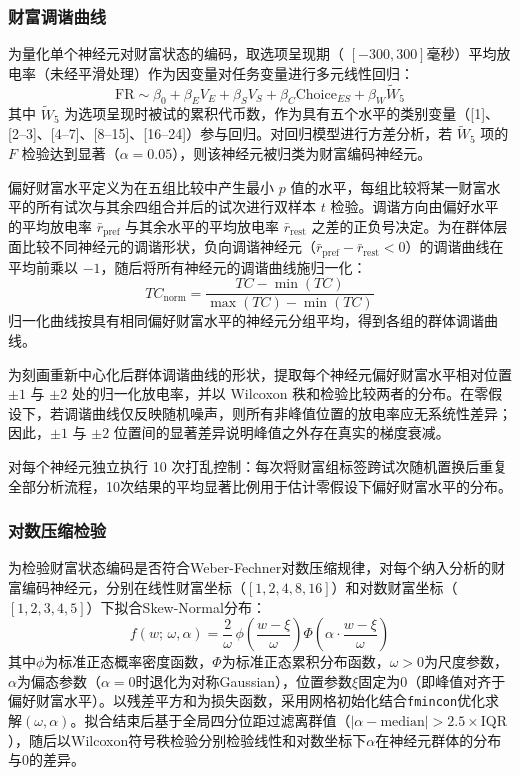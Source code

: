 \subsubsection{财富调谐曲线}\label{chap2:methods_neural_wealth_tuning}
为量化单个神经元对财富状态的编码，取选项呈现期（ $[-300,300]$毫秒）平均放电率（未经平滑处理）作为因变量对任务变量进行多元线性回归：
\begin{equation}
    \mathrm{FR} \sim \beta_0 + \beta_E V_E + \beta_S V_S + \beta_C \mathrm{Choice}_{ES} + \beta_W \tilde{W}_5
\end{equation}
其中 $\tilde{W}_5$ 为选项呈现时被试的累积代币数，作为具有五个水平的类别变量（[1]、[2--3]、[4--7]、[8--15]、[16--24]）参与回归。对回归模型进行方差分析，若 $\tilde{W}_5$ 项的 $F$ 检验达到显著（$\alpha = 0.05$），则该神经元被归类为财富编码神经元。

偏好财富水平定义为在五组比较中产生最小 $p$ 值的水平，每组比较将某一财富水平的所有试次与其余四组合并后的试次进行双样本 $t$ 检验。调谐方向由偏好水平的平均放电率 $\bar{r}_{\mathrm{pref}}$ 与其余水平的平均放电率 $\bar{r}_{\mathrm{rest}}$ 之差的正负号决定。为在群体层面比较不同神经元的调谐形状，负向调谐神经元（$\bar{r}_{\mathrm{pref}} - \bar{r}_{\mathrm{rest}} < 0$）的调谐曲线在平均前乘以 $-1$，随后将所有神经元的调谐曲线施归一化：
\begin{equation}
    TC_{\mathrm{norm}} = \frac{TC - \min(TC)}{\max(TC) - \min(TC)}
\end{equation}
归一化曲线按具有相同偏好财富水平的神经元分组平均，得到各组的群体调谐曲线。

为刻画重新中心化后群体调谐曲线的形状，提取每个神经元偏好财富水平相对位置 $\pm 1$ 与 $\pm 2$ 处的归一化放电率，并以 Wilcoxon 秩和检验比较两者的分布。在零假设下，若调谐曲线仅反映随机噪声，则所有非峰值位置的放电率应无系统性差异；因此，$\pm 1$ 与 $\pm 2$ 位置间的显著差异说明峰值之外存在真实的梯度衰减。

对每个神经元独立执行 10 次打乱控制：每次将财富组标签跨试次随机置换后重复全部分析流程，10次结果的平均显著比例用于估计零假设下偏好财富水平的分布。

\subsubsection{对数压缩检验}\label{chap2:methods_neural_wealth_log}
为检验财富状态编码是否符合Weber-Fechner对数压缩规律，对每个纳入分析的财富编码神经元，分别在线性财富坐标（$[1,2,4,8,16]$）和对数财富坐标（$[1,2,3,4,5]$）下拟合Skew-Normal分布：
\begin{equation}
    f(w;\,\omega,\alpha) = \frac{2}{\omega}\,\phi\!\left(\frac{w-\xi}{\omega}\right)\Phi\!\left(\alpha\cdot\frac{w-\xi}{\omega}\right)
\end{equation}
其中$\phi$为标准正态概率密度函数，$\Phi$为标准正态累积分布函数，$\omega>0$为尺度参数，$\alpha$为偏态参数（$\alpha=0$时退化为对称Gaussian），位置参数$\xi$固定为0（即峰值对齐于偏好财富水平）。以残差平方和为损失函数，采用网格初始化结合\texttt{fmincon}优化求解$(\omega,\alpha)$。拟合结束后基于全局四分位距过滤离群值（$|\alpha - \text{median}| > 2.5 \times \text{IQR}$），随后以Wilcoxon符号秩检验分别检验线性和对数坐标下$\alpha$在神经元群体的分布与0的差异。

